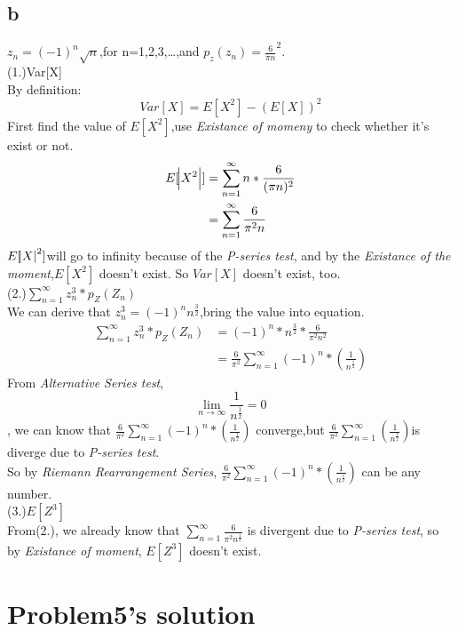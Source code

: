 \documentclass[a4paper,11pt]{article} %
\begin{document}
\subsection{b}
$z_n=(-1)^n\sqrt{n}$,for n=1,2,3,\dots,and $p_z(z_n)=\frac{6}{\pi n}^2$.\\
(1.)Var[X]\\
By definition:\\
\begin{equation}
\label{equation4}
    Var[X]=E[X^2]-(E[X])^2
\end{equation}
First find the value of $E[X^2]$,use \emph{Existance of momeny} to check whether it's exist or not.\\
\begin{align*}
    E[\abs{X^2}]&=\sum_{n=1}^{\infty}n*\frac{6}{(\pi n)^2}\\
                &=\sum_{n=1}^{\infty}\frac{6}{\pi^2 n}
\end{align*}
$E[\abs X^2]$will go to infinity because of the \emph{P-series test}, and by the \emph{Existance of the moment},$E[X^2]$ doesn't exist. So $Var[X]$ doesn't exist, too.\\
(2.)$\sum_{n=1}^{\infty}z_n^3*p_Z(Z_n)$\\
We can derive that $z_n^3=(-1)^n n^{\frac{3}{2}}$,bring the value into equation.\\
\begin{align*}
    \sum_{n=1}^{\infty}z_n^3*p_Z(Z_n)&=(-1)^n*n^{\frac{3}{2}}*\frac{6}{\pi^2n^2}\\
                                     &=\frac{6}{\pi^2}\sum_{n=1}^{\infty}(-1)^n*(\frac{1}{n^\frac{1}{2}})
\end{align*}
From \emph{Alternative Series test},\[ \lim_{n \to \infty} \frac{1}{n^{\frac{1}{2}}} = 0 \],
we can know that $\frac{6}{\pi^2}\sum_{n=1}^{\infty}(-1)^n*(\frac{1}{n^ \frac{1}{2}})$ converge,but $\frac{6}{\pi^2}\sum_{n=1}^{\infty}(\frac{1}{n^\frac{1}{2}})$is diverge due to \emph{P-series test}.\\
So by \emph{Riemann Rearrangement Series}, $\frac{6}{\pi^2}\sum_{n=1}^{\infty}(-1)^n*(\frac{1}{n^\frac{1}{2}})$ can be any number.\\
(3.)$E[Z^3]$\\
From(2.), we already know that $\sum_{n=1}^{\infty}\frac{6}{\pi^2n^{\frac{1}{2}}}$ is divergent due to \emph{P-series test}, so by \emph{Existance of moment}, $E[Z^3]$ doesn't exist.

\section{Problem5's solution}
\end{document}
